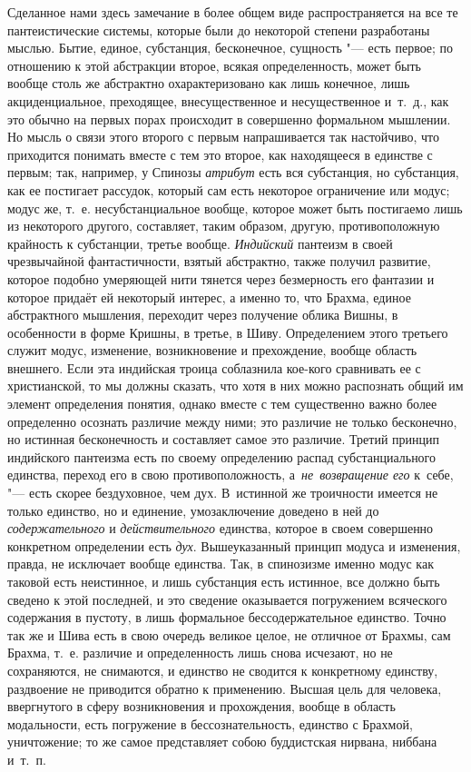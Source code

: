 Сделанное нами здесь замечание в более общем виде распространяется на все те
пантеистические системы, которые были до некоторой степени разработаны мыслью.
Бытие, единое, субстанция, бесконечное, сущность "--- есть первое; по отношению
к этой абстракции второе, всякая определенность, может быть вообще столь же
абстрактно охарактеризовано как лишь конечное, лишь акциденциальное,
преходящее, внесущественное и несущественное и~т.~д., как это обычно на первых
порах происходит в совершенно формальном мышлении. Но мысль о связи этого
второго с первым напрашивается так настойчиво, что приходится понимать вместе с
тем это второе, как находящееся в единстве с первым; так, например, у Спинозы
{\em атрибут} есть вся субстанция, но субстанция, как ее постигает рассудок,
который сам есть некоторое ограничение или модус; модус же, т.~е.
несубстанциальное вообще, которое может быть постигаемо лишь из некоторого
другого, составляет, таким образом, другую, противоположную крайность к
субстанции, третье вообще. {\em Индийский} пантеизм в своей чрезвычайной
фантастичности, взятый абстрактно, также получил развитие, которое подобно
умеряющей нити тянется через безмерность его фантазии и которое придаёт ей
некоторый интерес, а именно то, что Брахма, единое абстрактного мышления,
переходит через получение облика Вишны, в особенности в форме Кришны, в третье,
в Шиву. Определением этого третьего служит модус, изменение, возникновение и
прехождение, вообще область внешнего. Если эта индийская троица соблазнила
кое-кого сравнивать ее с христианской, то мы должны сказать, что хотя в них
можно распознать общий им элемент определения понятия, однако вместе с тем
существенно важно более определенно осознать различие между ними; это различие
не только бесконечно, но истинная бесконечность и составляет самое это
различие. Третий принцип индийского пантеизма есть по своему определению распад
субстанциального единства, переход его в свою противоположность,
а~{\em не~возвращение его} к~себе, "--- есть скорее бездуховное, чем дух.
В~истинной же троичности имеется не только единство, но и единение,
умозаключение доведено в ней до {\em содержательного} и {\em действительного}
единства, которое в своем совершенно конкретном определении есть {\em дух}.
Вышеуказанный принцип модуса и изменения, правда, не исключает вообще единства.
Так, в спинозизме именно модус как таковой есть неистинное, и лишь субстанция
есть истинное, все должно быть сведено к этой последней, и это сведение
оказывается погружением всяческого содержания в пустоту, в лишь формальное
бессодержательное единство. Точно так же и Шива есть в свою очередь великое
целое, не отличное от Брахмы, сам Брахма, т.~е. различие и определенность лишь
снова исчезают, но не сохраняются, не снимаются, и единство не сводится к
конкретному единству, раздвоение не приводится обратно к применению. Высшая
цель для человека, ввергнутого в сферу возникновения и прохождения, вообще в
область модальности, есть погружение в бессознательность, единство с Брахмой,
уничтожение; то же самое представляет собою буддистская нирвана, ниббана
и~т.~п.


